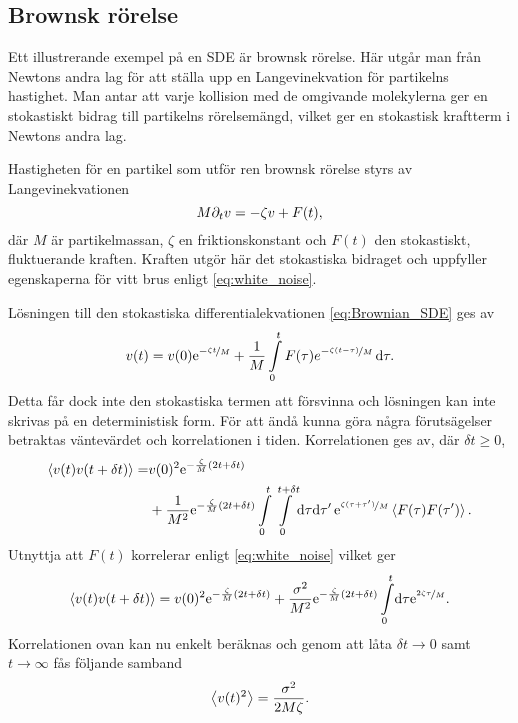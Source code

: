 \subsection{Brownsk rörelse}\label{sec:brown}
Ett illustrerande exempel på en SDE är brownsk rörelse. Här utgår man från Newtons andra lag för att ställa upp en Langevinekvation för partikelns hastighet. Man antar att varje kollision med de omgivande molekylerna ger en stokastiskt bidrag till partikelns rörelsemängd, vilket ger en stokastisk kraftterm i Newtons andra lag.

Hastigheten för en partikel som utför ren brownsk rörelse styrs av
Langevinekvationen~\cite{Mazo_Brownian2002} 
\begin{equation} \label{eq:Brownian_SDE}
    M\partial_tv=-\zeta v + F(t),
\end{equation}
där $M$ är partikelmassan, $\zeta$ en friktionskonstant och $F(t)$ den
stokastiskt, fluktuerande kraften. Kraften utgör här det stokastiska
bidraget och uppfyller egenskaperna för vitt brus enligt \eqref{eq:white_noise}.


Lösningen till den stokastiska differentialekvationen
\eqref{eq:Brownian_SDE} ges av  
\begin{equation}
v(t)
=v(0)\ee^{-\nicefrac{\zeta t}{M}}
 +\frac{1}{M}\int^t_0 F(\tau)e^{-\nicefrac{\zeta (t-\tau)}{M}} \id\tau.
\end{equation}
Detta får dock inte den stokastiska termen att försvinna och lösningen kan inte skrivas på en deterministisk form. För att ändå kunna göra några förutsägelser betraktas väntevärdet och korrelationen i tiden. Korrelationen ges av, där $\delta t\geq0$,
\begin{equation}\label{Brownian_korr}
\begin{aligned}
\ev{v(t)v(t+\delta t)} 
=& v(0)^2\ee^{-\frac{\zeta}{M}(2t+\delta t)}\\
 &+ \frac{1}{M^2}\ee^{-\frac{\zeta}{M} (2t+\delta t)}
  \int_0^t\int_0^{t+\delta t}\!\dd\tau\dd\tau'\, 
     \ee^{\nicefrac{\zeta (\tau+\tau')}{M}}\ev{F(\tau)F(\tau')}.
\end{aligned}
\end{equation}
Utnyttja att $F(t)$ korrelerar enligt \eqref{eq:white_noise} vilket ger 
\begin{equation} \label{eq:Brown_korr}
\ev{v(t)v(t+\delta t)} 
= v(0)^2\ee^{-\frac{\zeta}{M}(2t+\delta t)}
 +\frac{\sigma^2}{M^2}\ee^{-\frac{\zeta}{M} (2t+\delta t)}
  \int_0^t\!\dd\tau\ee^{\nicefrac{2\zeta \tau}{M}}.
\end{equation}
Korrelationen ovan kan nu enkelt beräknas och genom att låta $\delta t\to 0$ samt $t\to \infty$ fås följande samband
\begin{equation}
    \ev{v(t)^2} = \frac{\sigma^2}{2M\zeta}.
\end{equation}

